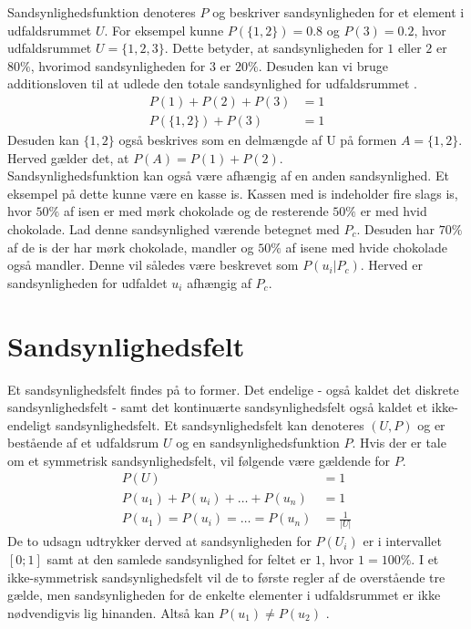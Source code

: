 \documentclass[../../SRP.tex]{subfiles}
\begin{document}
Sandsynlighedsfunktion denoteres $P$ og beskriver sandsynligheden for et element i udfaldsrummet $U$. For eksempel kunne $P(\{1,2\}) = 0.8$ og $P(3) = 0.2$, hvor udfaldsrummet $U = \{1,2,3\}$. Dette betyder, at sandsynligheden for $1$ eller $2$ er $80\%$, hvorimod sandsynligheden for $3$ er $20\%$. Desuden kan vi bruge additionsloven til at udlede den totale sandsynlighed for udfaldsrummet \cite{SC}.
\begin{align}
  P(1) + P(2) + P(3) &= 1 \\
  P(\{1,2\}) + P(3) &= 1
\end{align}
Desuden kan $\{1,2\}$ også beskrives som en delmængde af U på formen $A = \{1,2\}$. Herved gælder det, at $P(A) = P(1) + P(2)$. \\

Sandsynlighedsfunktion kan også være afhængig af en anden sandsynlighed. Et eksempel på dette kunne være en kasse is. Kassen med is indeholder fire slags is, hvor $50\%$ af isen er med mørk chokolade og de resterende $50\%$ er med hvid chokolade. Lad denne sandsynlighed værende betegnet med $P_c$. Desuden har $70\%$ af de is der har mørk chokolade, mandler og $50\%$ af isene med hvide chokolade også mandler. Denne vil således være beskrevet som $P(u_i | P_c)$. Herved er sandsynligheden for udfaldet $u_i$ afhængig af $P_c$.

\section{Sandsynlighedsfelt}

Et sandsynlighedsfelt findes på to former. Det endelige - også kaldet det diskrete sandsynlighedsfelt - samt det kontinuærte sandsynlighedsfelt også kaldet et ikke-endeligt sandsynlighedsfelt. Et sandsynlighedsfelt kan denoteres $(U, P)$ og er bestående af et udfaldsrum $U$ og en sandsynlighedsfunktion $P$. Hvis der er tale om et symmetrisk sandsynlighedsfelt, vil følgende være gældende for $P$.
\begin{align}
  P(U) &= 1 \\
  P(u_1) + P(u_i) + \dots + P(u_n) &= 1 \\
  P(u_1) = P(u_i) = \dots = P(u_n) &= \frac{1}{|U|}
\end{align}
De to udsagn udtrykker derved at sandsynligheden for $P(U_i)$ er i intervallet $[0;1]$ samt at den samlede sandsynlighed for feltet er $1$, hvor $1 = 100\%$. I et ikke-symmetrisk sandsynlighedsfelt vil de to første regler af de overstående tre gælde, men sandsynligheden for de enkelte elementer i udfaldsrummet er ikke nødvendigvis lig hinanden. Altså kan $P(u_1) \neq P(u_2)$ \cite{SC}.\\
\end{document}
